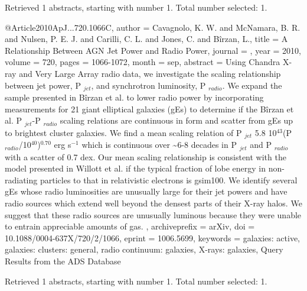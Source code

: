 \documentclass[longauth]{aa}
\begin{document}
{{{{{{{{{Retrieved 1 abstracts, starting with number 1.  Total number selected: 1.

@Article{2010ApJ...720.1066C,
  author        = {Cavagnolo, K. W. and McNamara, B. R. and Nulsen, P. E. J. and Carilli, C. L. and Jones, C. and B{\^i}rzan, L.},
  title         = {A Relationship Between AGN Jet Power and Radio Power},
  journal       = {\apj},
  year          = {2010},
  volume        = {720},
  pages         = {1066-1072},
  month         = sep,
  abstract      = {Using Chandra X-ray and Very Large Array radio data, we investigate the
scaling relationship between jet power, P $_{jet}$, and
synchrotron luminosity, P $_{radio}$. We expand the sample
presented in B{\^i}rzan et al. to lower radio power by incorporating
measurements for 21 giant elliptical galaxies (gEs) to determine if the
B{\^i}rzan et al. P $_{jet}$-P $_{radio}$ scaling
relations are continuous in form and scatter from gEs up to brightest
cluster galaxies. We find a mean scaling relation of P $_{jet}$
{\ap} 5.8 {\times} 10$^{43}$(P
$_{radio}$/10$^{40}$)$^{0.70}$ erg s$^{-1}$
which is continuous over \~{}6-8 decades in P $_{jet}$ and P
$_{radio}$ with a scatter of {\ap} 0.7 dex. Our mean scaling
relationship is consistent with the model presented in Willott et al. if
the typical fraction of lobe energy in non-radiating particles to that
in relativistic electrons is gsim100. We identify several gEs whose
radio luminosities are unusually large for their jet powers and have
radio sources which extend well beyond the densest parts of their X-ray
halos. We suggest that these radio sources are unusually luminous
because they were unable to entrain appreciable amounts of gas.
},
  archiveprefix = {arXiv},
  doi           = {10.1088/0004-637X/720/2/1066},
  eprint        = {1006.5699},
  keywords      = {galaxies: active, galaxies: clusters: general, radio continuum: galaxies, X-rays: galaxies},
}
Query Results from the ADS Database


Retrieved 1 abstracts, starting with number 1.  Total number selected: 1.

}}}}}}}}}
\end{document}

